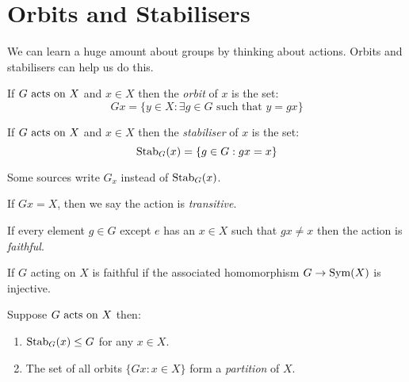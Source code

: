 \documentclass[../main.tex]{subfiles}
\begin{document}
\section{Orbits and Stabilisers}
We can learn a huge amount about groups by thinking about actions.
Orbits and stabilisers can help us do this.
\begin{definition}[Orbit]
  If $G \text{ acts on } X$ and $x \in X$ then the \textit{orbit} of $x$ is the set:
  \[
    Gx = \{y \in X : \exists g \in G \text{ such that } y = gx\}
  \]
\end{definition}
\begin{definition}[Stabiliser]
  If $G \text{ acts on } X$ and $x \in X$ then the \textit{stabiliser} of $x$ is the set:
  \[
    \operatorname{Stab}_G(x) = \{g \in G : gx = x\}
  \]
\end{definition}
\begin{remark}[Warning]
  Some sources write $G_x$ instead of $\operatorname{Stab}_G(x)$.
\end{remark}
\begin{definition}[Transitive]
  If $Gx = X$, then we say the action is \textit{transitive}.
\end{definition}
\begin{definition}[Faithful]
  If every element $g \in G$ except $e$ has an $x \in X$ such that $gx \neq x$ then the action is \textit{faithful}.
\end{definition}
\begin{remark}
  If $G$ acting on $X$ is faithful if the associated homomorphism $G \to \operatorname{Sym}(X)$ is injective.
\end{remark}
\begin{proposition}
  Suppose $G \text{ acts on } X$ then:
  \begin{enumerate}
    \item $\operatorname{Stab}_G(x) \leq G$ for any $x \in X$.
    \item The set of all orbits $\{Gx : x \in X\}$ form a \textit{partition} of $X$.
  \end{enumerate}
\end{proposition}
\end{document}
